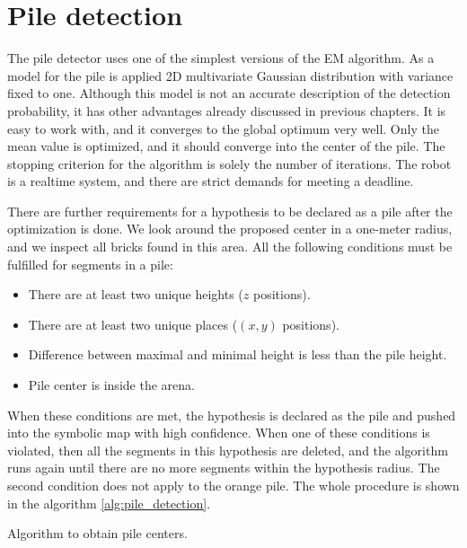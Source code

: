 \section{Pile detection}
The pile detector uses one of the simplest versions of the EM algorithm. As a model for the pile is applied 2D multivariate Gaussian distribution with variance fixed to one. Although this model is not an accurate description of the detection probability, it has other advantages already discussed in previous chapters. It is easy to work with, and it converges to the global optimum very well. Only the mean value is optimized, and it should converge into the center of the pile. The stopping criterion for the algorithm is solely the number of iterations. The robot is a realtime system, and there are strict demands for meeting a deadline. 

There are further requirements for a hypothesis to be declared as a pile after the optimization is done. We look around the proposed center in a one-meter radius, and we inspect all bricks found in this area. All the following conditions must be fulfilled for segments in a pile:
\begin{itemize}
\item There are at least two unique heights ($z$ positions).
\item There are at least two unique places ($(x,y)$ positions).
\item Difference between maximal and minimal height is less than the pile height.
\item Pile center is inside the arena.
\end{itemize}
When these conditions are met, the hypothesis is declared as the pile and pushed into the symbolic map with high confidence. When one of these conditions is violated, then all the segments in this hypothesis are deleted, and the algorithm runs again until there are no more segments within the hypothesis radius. The second condition does not apply to the orange pile. The whole procedure is shown in the algorithm \ref{alg:pile_detection}.
\begin{algorithm}[]
 \caption{Algorithm to obtain pile centers.}
 \label{alg:pile_detection}
\end{algorithm}

